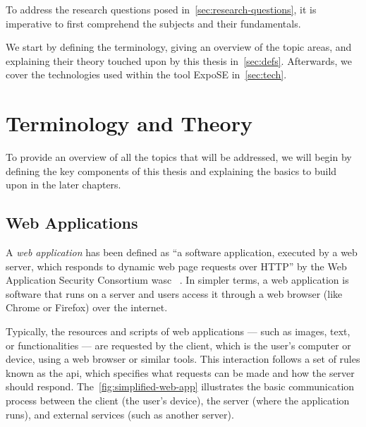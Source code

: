 To address the research questions posed in~\autoref{sec:research-questions}, it is imperative to first comprehend the subjects and their fundamentals. 

We start by defining the terminology, giving an overview of the topic areas, and explaining their theory touched upon by this thesis in~\autoref{sec:defs}. Afterwards, we cover the technologies used within the tool ExpoSE in~\autoref{sec:tech}.

\section{Terminology and Theory}
\label{sec:defs}
To provide an overview of all the topics that will be addressed, we will begin by defining the key components of this thesis and explaining the basics to build upon in the later chapters. 

\subsection{Web Applications}
\label{sec:webapp}
A \textit{web application} has been defined as “a software application, executed by a web server, which responds to dynamic web page requests over HTTP” by the Web Application Security Consortium \gls{wasc} ~\cite{noauthor_web_2012}. 
In simpler terms, a web application is software that runs on a server and users access it through a web browser (like Chrome or Firefox) over the internet.

Typically, the resources and scripts of web applications — such as images, text, or functionalities — are requested by the client, which is the user's computer or device, using a web browser or similar tools. This interaction follows a set of rules known as the \gls{api}, which specifies what requests can be made and how the server should respond.
The~\autoref{fig:simplified-web-app} illustrates the basic communication process between the client (the user's device), the server (where the application runs), and external services (such as another server).


